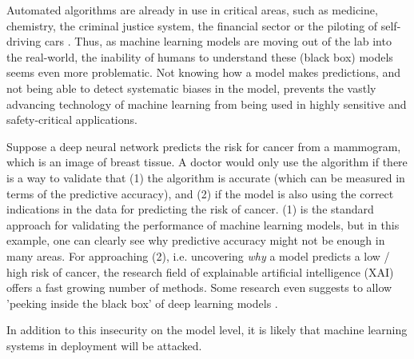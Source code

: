 Automated algorithms are already in use in critical areas, such as medicine, chemistry, the criminal justice system, the financial sector or the piloting of self-driving cars \cite{chouldechova2017fair, elshawi2019interpretability, whitmore2016mapping}. %
Thus, as machine learning models are moving out of the lab into the real-world, the inability of humans to understand these (black box) models seems even more problematic. Not knowing how a model makes predictions, and not being able to detect systematic biases in the model, prevents the vastly advancing technology of machine learning from being used in highly sensitive and safety-critical applications.  

Suppose a deep neural network predicts the risk for cancer from a mammogram, which is an image of breast tissue. A doctor would only use the algorithm if there is a way to validate that (1) the algorithm is accurate (which can be measured in terms of the predictive accuracy), and (2) if the model is also using the correct indications in the data for predicting the risk of cancer. (1) is the standard approach for validating the performance of machine learning models, but in this example, one can clearly see why predictive accuracy might not be enough in many areas. For approaching (2), i.e. uncovering \textit{why} a model predicts a low / high risk of cancer, the research field of explainable artificial intelligence (XAI) offers a fast growing number of methods. Some research even suggests to allow 'peeking inside the black box' of deep learning models \cite{adadi2018peeking}.  

In addition to this insecurity on the model level, it is likely that machine learning systems in deployment will be attacked. %


